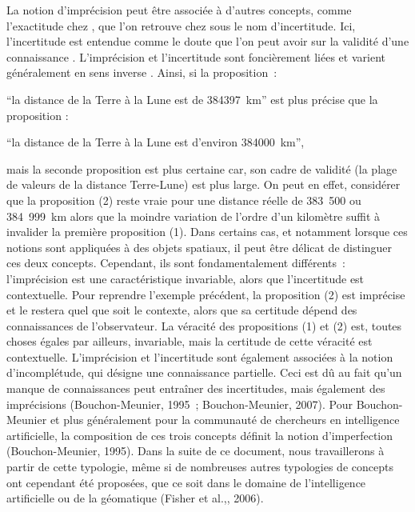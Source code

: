 La notion d’imprécision peut être associée à d’autres concepts, comme
l’exactitude chez \textcite{Russell1923}, que l’on retrouve chez
\textcite{Bouchon-Meunier1995, Bouchon-Meunier2007} sous le nom
d’incertitude. Ici, l’incertitude est entendue comme le doute que l’on
peut avoir sur la validité d’une connaissance
\autocite{Bouchon-Meunier1995}. L’imprécision et l’incertitude sont
foncièrement liées et varient généralement en sens inverse
\autocite{Russell1923}. Ainsi, si la proposition :
%
\begin{enumerate*}[label=(\alph*)]
  \item \enquote{la distance
de la Terre à la Lune est de \SI{384397}{\kilo\meter}} est plus précise que la
proposition :
\item \enquote{la distance de la Terre à la Lune est d’environ
\SI{384000}{\kilo\meter}},
\end{enumerate*}
%
mais la seconde proposition est plus certaine car, son
cadre de validité (la plage de valeurs de la distance Terre-Lune) est
plus large. On peut en effet, considérer que la proposition (2) reste
vraie pour une distance réelle de 383 500 ou 384 999 km alors que la
moindre variation de l’ordre d’un kilomètre suffit à invalider la
première proposition (1). Dans certains cas, et notamment lorsque ces
notions sont appliquées à des objets spatiaux, il peut être délicat de
distinguer ces deux concepts. Cependant, ils sont fondamentalement
différents : l’imprécision est une caractéristique invariable, alors
que l’incertitude est contextuelle. Pour reprendre l’exemple
précédent, la proposition (2) est imprécise et le restera quel que
soit le contexte, alors que sa certitude dépend des connaissances de
l’observateur. La véracité des propositions (1) et (2) est, toutes
choses égales par ailleurs, invariable, mais la certitude de cette
véracité est contextuelle.  L’imprécision et l’incertitude sont
également associées à la notion d’incomplétude, qui désigne une
connaissance partielle. Ceci est dû au fait qu’un manque de
connaissances peut entraîner des incertitudes, mais également des
imprécisions (Bouchon-Meunier, 1995 ; Bouchon-Meunier, 2007). Pour
Bouchon-Meunier et plus généralement pour la communauté de chercheurs
en intelligence artificielle, la composition de ces trois concepts
définit la notion d’imperfection (Bouchon-Meunier, 1995). Dans la
suite de ce document, nous travaillerons à partir de cette typologie,
même si de nombreuses autres typologies de concepts ont cependant été
proposées, que ce soit dans le domaine de l’intelligence artificielle
ou de la géomatique (Fisher et al.,, 2006).

